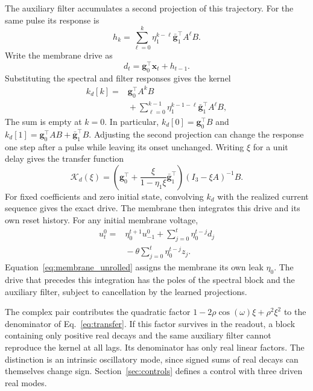 \documentclass[letterpaper,journal]{IEEEtran}
\begin{document}
The auxiliary filter accumulates a second projection of this trajectory. For the same pulse its response is
\begin{equation}
h_k=\sum_{\ell=0}^{k}\eta_1^{k-\ell}
                \bar{\mathbf g}_1^\top A^\ell B.
\label{eq:h_kernel}
\end{equation}
Write the membrane drive as
\begin{equation}
d_t=\mathbf g_0^\top\mathbf x_t+h_{t-1}.
\label{eq:drive}
\end{equation}
Substituting the spectral and filter responses gives the kernel
\begin{equation}
\begin{aligned}
k_d[k]={}&\mathbf g_0^\top A^kB\\
&{}+\sum_{\ell=0}^{k-1}\eta_1^{k-1-\ell}
                       \bar{\mathbf g}_1^\top A^\ell B ,
\end{aligned}
\label{eq:drive_kernel}
\end{equation}
The sum is empty at $k=0$. In particular, $k_d[0]=\mathbf g_0^\top B$ and $k_d[1]=\mathbf g_0^\top AB+\bar{\mathbf g}_1^\top B$. Adjusting the second projection can change the response one step after a pulse while leaving its onset unchanged. Writing $\xi$ for a unit delay gives the transfer function
\begin{equation}
\mathcal K_d(\xi)=
\left(\mathbf g_0^\top+
\frac{\xi}{1-\eta_1\xi}\bar{\mathbf g}_1^\top\right)
(I_3-\xi A)^{-1}B.
\label{eq:transfer}
\end{equation}
For fixed coefficients and zero initial state, convolving $k_d$ with the realized current sequence gives the exact drive. The membrane then integrates this drive and its own reset history. For any initial membrane voltage,
\begin{equation}
\begin{aligned}
u_t^0={}&\eta_0^{t+1}u_{-1}^0
+\sum_{j=0}^{t}\eta_0^{t-j}d_j\\
&{}-\theta\sum_{j=0}^{t}\eta_0^{t-j}z_j .
\end{aligned}
\label{eq:membrane_unrolled}
\end{equation}
Equation~\eqref{eq:membrane_unrolled} assigns the membrane its own leak $\eta_0$. The drive that precedes this integration has the poles of the spectral block and the auxiliary filter, subject to cancellation by the learned projections.

The complex pair contributes the quadratic factor $1-2\rho\cos(\omega)\xi+\rho^2\xi^2$ to the denominator of Eq.~\eqref{eq:transfer}. If this factor survives in the readout, a block containing only positive real decays and the same auxiliary filter cannot reproduce the kernel at all lags. Its denominator has only real linear factors. The distinction is an intrinsic oscillatory mode, since signed sums of real decays can themselves change sign. Section~\ref{sec:controls} defines a control with three driven real modes.
\end{document}
